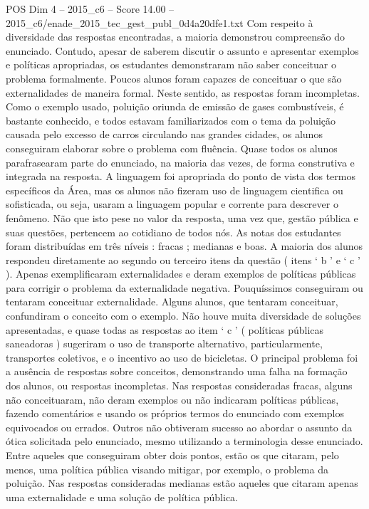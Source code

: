 \begin{textsample}{POS Dim 4 – 2015\_c6 – Score 14.00 – 2015\_c6/enade\_2015\_tec\_gest\_publ\_0d4a20dfe1.txt}
Com respeito à diversidade das respostas encontradas, a maioria demonstrou compreensão do enunciado.
Contudo, apesar de saberem discutir o assunto e apresentar exemplos e políticas apropriadas, os estudantes demonstraram não saber conceituar o problema formalmente.
Poucos alunos foram capazes de conceituar o que são externalidades de maneira formal.
Neste sentido, as respostas foram incompletas.
Como o exemplo usado, poluição oriunda de emissão de gases combustíveis, é bastante conhecido, e todos estavam familiarizados com o tema da poluição causada pelo excesso de carros circulando nas grandes cidades, os alunos conseguiram elaborar sobre o problema com fluência.
Quase todos os alunos parafrasearam parte do enunciado, na maioria das vezes, de forma construtiva e integrada na resposta.
A linguagem foi apropriada do ponto de vista dos termos específicos da Área, mas os alunos não fizeram uso de linguagem cientifica ou sofisticada, ou seja, usaram a linguagem popular e corrente para descrever o fenômeno.
Não que isto pese no valor da resposta, uma vez que, gestão pública e suas questões, pertencem ao cotidiano de todos nós.
As notas dos estudantes foram distribuídas em três níveis : fracas ; medianas e boas.
A maioria dos alunos respondeu diretamente ao segundo ou terceiro itens da questão ( itens ‘ b ’ e ‘ c ’ ).
Apenas exemplificaram externalidades e deram exemplos de políticas públicas para corrigir o problema da externalidade negativa.
Pouquíssimos conseguiram ou tentaram conceituar externalidade.
Alguns alunos, que tentaram conceituar, confundiram o conceito com o exemplo.
Não houve muita diversidade de soluções apresentadas, e quase todas as respostas ao item ‘ c ’ ( políticas públicas saneadoras ) sugeriram o uso de transporte alternativo, particularmente, transportes coletivos, e o incentivo ao uso de bicicletas.
O principal problema foi a ausência de respostas sobre conceitos, demonstrando uma falha na formação dos alunos, ou respostas incompletas.
Nas respostas consideradas fracas, alguns não conceituaram, não deram exemplos ou não indicaram políticas públicas, fazendo comentários e usando os próprios termos do enunciado com exemplos equivocados ou errados.
Outros não obtiveram sucesso ao abordar o assunto da ótica solicitada pelo enunciado, mesmo utilizando a terminologia desse enunciado.
Entre aqueles que conseguiram obter dois pontos, estão os que citaram, pelo menos, uma política pública visando mitigar, por exemplo, o problema da poluição.
Nas respostas consideradas medianas estão aqueles que citaram apenas uma externalidade e uma solução de política pública.

\end{textsample}
